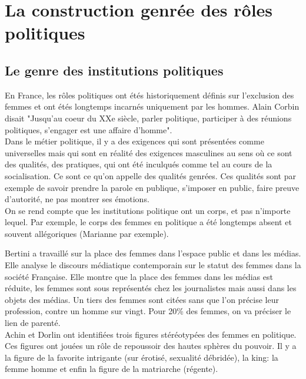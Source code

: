 \documentclass[10pt, a4paper, openany]{book}
\begin{document}
\section{La construction genrée des rôles politiques}

\subsection{Le genre des institutions politiques}

En France, les rôles politiques ont étés historiquement définis sur l'exclusion des femmes et ont étés longtemps incarnés uniquement par les hommes. Alain Corbin disait "Jusqu'au coeur du XXe siècle, parler politique, participer à des réunions politiques, s'engager est une affaire d'homme". \\
Dans le métier politique, il y a des exigences qui sont présentées comme universelles mais qui sont en réalité des exigences masculines au sens où ce sont des qualités, des pratiques, qui ont été inculqués comme tel au cours de la socialisation. Ce sont ce qu'on appelle des qualités genrées. Ces qualités sont par exemple de savoir prendre la parole en publique, s'imposer en public, faire preuve d'autorité, ne pas montrer ses émotions. \\
On se rend compte que les institutions politique ont un corps, et pas n'importe lequel. Par exemple, le corps des femmes en politique a été longtemps absent et souvent allégoriques (Marianne par exemple). 


Bertini a travaillé sur la place des femmes dans l'espace public et dans les médias. Elle analyse le discours médiatique contemporain sur le statut des femmes dans la société Française. Elle montre que la place des femmes dans les médias est réduite, les femmes sont sous représentés chez les journalistes mais aussi dans les objets des médias. Un tiers des femmes sont citées sans que l'on précise leur profession, contre un homme sur vingt. Pour 20\% des femmes, on va préciser le lien de parenté. \\
Achin et Dorlin ont identifiées trois figures stéréotypées des femmes en politique. Ces figures ont jouées un rôle de repoussoir des hautes sphères du pouvoir. Il y a la figure de la favorite intrigante (sur érotisé, sexualité débridée), la king: la femme homme et enfin la figure de la matriarche (régente). 
\end{document}
